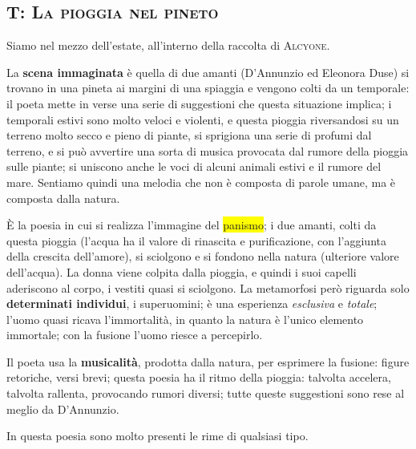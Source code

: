 \documentclass{book}
\newcommand{\pagine}[1]{\colorbox{yellow}{#1}}
\newcommand{\evidenziatore}[1]{\textbf{#1}}
\newcounter{mar}
\begin{document}
\subsection{T: \textsc{La pioggia nel pineto}}

Siamo nel mezzo dell'estate, all'interno della raccolta di
\textsc{Alcyone}.

La \evidenziatore{scena immaginata} è quella di due amanti (D'Annunzio
ed Eleonora Duse) si trovano in una pineta ai margini di una spiaggia e
vengono colti da un temporale: il poeta mette in verse una serie di
suggestioni che questa situazione implica; i temporali estivi sono molto
veloci e violenti, e questa pioggia riversandosi su un terreno molto
secco e pieno di piante, si sprigiona una serie di profumi dal terreno,
e si può avvertire una sorta di musica provocata dal rumore della
pioggia sulle piante; si uniscono anche le voci di alcuni animali estivi
e il rumore del mare. Sentiamo quindi una melodia che non è composta di
parole umane, ma è composta dalla natura.

È la poesia in cui si realizza l'immagine del \pagine{panismo}; i due
amanti, colti da questa pioggia (l'acqua ha il valore di rinascita e
purificazione, con l'aggiunta della crescita dell'amore), si sciolgono e
si fondono nella natura (ulteriore valore dell'acqua). La donna viene
colpita dalla pioggia, e quindi i suoi capelli aderiscono al corpo, i
vestiti quasi si sciolgono. La metamorfosi però riguarda solo
\textbf{determinati individui}, i superuomini; è una esperienza
\emph{esclusiva} e \emph{totale}; l'uomo quasi ricava l'immortalità, in
quanto la natura è l'unico elemento immortale; con la fusione l'uomo
riesce a percepirlo.

Il poeta usa la \evidenziatore{musicalità}, prodotta dalla natura, per
esprimere la fusione: figure retoriche, versi brevi; questa poesia ha il
ritmo della pioggia: talvolta accelera, talvolta rallenta, provocando
rumori diversi; tutte queste suggestioni sono rese al meglio da
D'Annunzio.

In questa poesia sono molto presenti le rime di qualsiasi tipo.

\setcounter{mar}{0}
\end{document}

